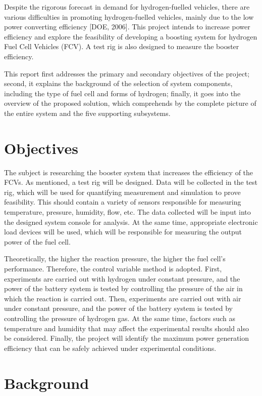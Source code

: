 \documentclass[a4paper,11pt]{article}
\begin{document}
Despite the rigorous forecast in demand for hydrogen-fuelled vehicles, there are various difficulties in promoting hydrogen-fuelled vehicles, mainly due to the low power converting efficiency [DOE, 2006]. This project intends to increase power efficiency and explore the feasibility of developing a boosting system for hydrogen Fuel Cell Vehicles (FCV). A test rig is also designed to measure the booster efficiency. 

This report first addresses the primary and secondary objectives of the project; second, it explains the background of the selection of system components, including the type of fuel cell and forms of hydrogen; finally, it goes into the overview of the proposed solution, which comprehends by the complete picture of the entire system and the five supporting subsystems.

\section{Objectives}

The subject is researching the booster system that increases the efficiency of the FCVs. As mentioned, a test rig will be designed. Data will be collected in the test rig, which will be used for quantifying measurement and simulation to prove feasibility. This should contain a variety of sensors responsible for measuring temperature, pressure, humidity, flow, etc. The data collected will be input into the designed system console for analysis. At the same time, appropriate electronic load devices will be used, which will be responsible for measuring the output power of the fuel cell.

Theoretically, the higher the reaction pressure, the higher the fuel cell’s performance. Therefore, the control variable method is adopted. First, experiments are carried out with hydrogen under constant pressure, and the power of the battery system is tested by controlling the pressure of the air in which the reaction is carried out. Then, experiments are carried out with air under constant pressure, and the power of the battery system is tested by controlling the pressure of hydrogen gas. At the same time, factors such as temperature and humidity that may affect the experimental results should also be considered. Finally, the project will identify the maximum power generation efficiency that can be safely achieved under experimental conditions.

\section{Background}
\end{document}
